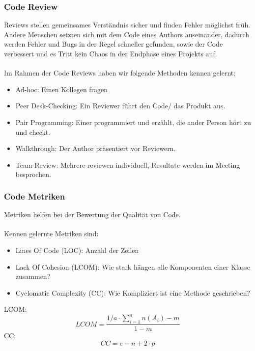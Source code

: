 \subsubsection{Code Review}

Reviews stellen gemeinsames Verständnis sicher und finden Fehler möglichst früh.
Andere Menschen setzten sich mit dem Code eines Authors auseinander, dadurch werden Fehler und Bugs in der Regel
schneller gefunden, sowie der Code verbessert und es Tritt kein Chaos in der Endphase eines Projekts auf.
\\ \\
Im Rahmen der Code Reviews haben wir folgende Methoden kennen gelernt:\\
\begin{itemize}
    \item Ad-hoc: Einen Kollegen fragen
    \item Peer Desk-Checking: Ein Reviewer führt den Code/ das Produkt aus.
    \item Pair Programming: Einer programmiert und erzählt, die ander Person hört zu und checkt.
    \item Walkthrough: Der Author präsentiert vor Reviewern.
    \item Team-Review: Mehrere reviewen individuell, Resultate werden im Meeting besprochen.
\end{itemize}

\subsubsection{Code Metriken}

Metriken helfen bei der Bewertung der Qualität von Code.
\\ \\
Kennen gelernte Metriken sind:
\begin{itemize}
    \item Lines Of Code (LOC): Anzahl der Zeilen
    \item Lack Of Cohesion (LCOM): Wie stark hängen alle Komponenten einer Klasse zusammen?
    \item Cyclomatic Complexity (CC): Wie Kompliziert ist eine Methode geschrieben?
\end{itemize}
LCOM: $$
    LCOM = \frac{1/a \cdot \sum^a_{i=1} n(A_i)-m}{1-m}
$$
CC: $$
    CC = e - n + 2 \cdot p
$$

